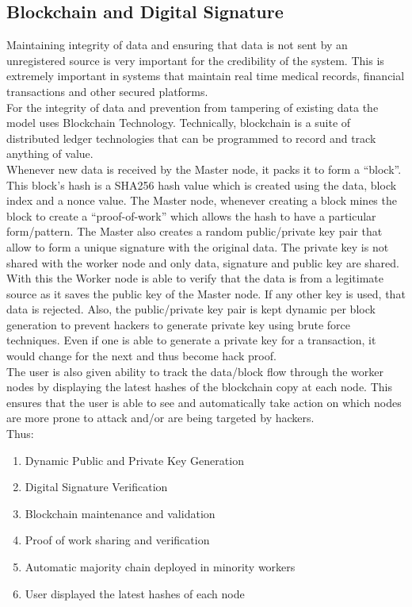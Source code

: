 \documentclass[10pt,journal,compsoc]{IEEEtran}
\begin{document}
\subsection{Blockchain and Digital Signature}
Maintaining integrity of data and ensuring that data is not sent by an unregistered source is very important for the credibility of the system. This is extremely important in systems that maintain real time medical records, financial transactions and other secured platforms. \\
For the integrity of data and prevention from tampering of existing data the model uses Blockchain Technology. Technically, blockchain is a suite of distributed ledger technologies that can be programmed to record and track anything of value. \\
Whenever new data is received by the Master node, it packs it to form a “block”. This block's hash is a SHA256 hash value which is created using the data, block index and a nonce value. The Master node, whenever creating a block mines the block to create a “proof-of-work” which allows the hash to have a particular form/pattern. The Master also creates a random public/private key pair that allow to form a unique signature with the original data. The private key is not shared with the worker node and only data, signature and public key are shared. With this the Worker node is able to verify that the data is from a legitimate source as it saves the public key of the Master node. If any other key is used, that data is rejected. Also, the public/private key pair is kept dynamic per block generation to prevent hackers to generate private key using brute force techniques. Even if one is able to generate a private key for a transaction, it would change for the next and thus become hack proof. \\
The user is also given ability to track the data/block flow through the worker nodes by displaying the latest hashes of the blockchain copy at each node. This ensures that the user is able to see and automatically take action on which nodes are more prone to attack and/or are being targeted by hackers.\\
Thus:
\begin{enumerate}
\item Dynamic Public and Private Key Generation
\item Digital Signature Verification
\item Blockchain maintenance and validation
\item Proof of work sharing and verification
\item Automatic majority chain deployed in minority workers
\item User displayed the latest hashes of each node
\end{enumerate}
\end{document}
